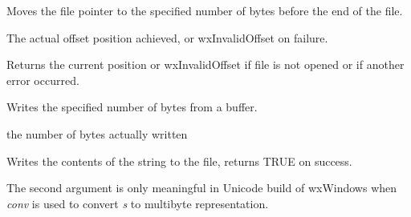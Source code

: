 Moves the file pointer to the specified number of bytes before the end of the file.




The actual offset position achieved, or wxInvalidOffset on failure.

\label{wxfiletell}


Returns the current position or wxInvalidOffset if file is not opened or if another
error occurred.

\label{wxfilewrite}


Writes the specified number of bytes from a buffer.





the number of bytes actually written

\label{wxfilewrites}


Writes the contents of the string to the file, returns TRUE on success.

The second argument is only meaningful in Unicode build of wxWindows when
{\it conv} is used to convert {\it s} to multibyte representation.

